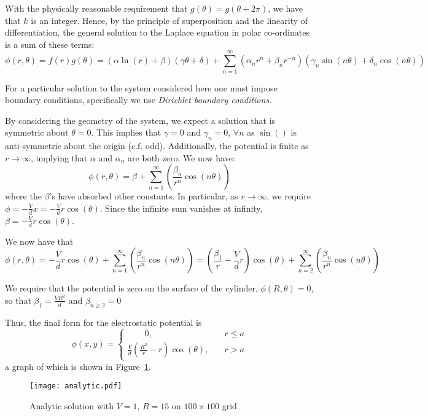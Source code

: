 \documentclass[12pt, a4paper]{article}
\newcommand{\be}{\begin{equation}}
\newcommand{\ee}{\end{equation}}
\begin{document}
With the physically reasonable requirement that $g(\theta)=g(\theta + 2\pi)$, we have
that $k$ is an integer. Hence, by the principle of superposition and the linearity of
differentiation, the general solution to the Laplace equation in polar co-ordinates is
a sum of these terms:
%
\be
\phi(r,\theta)
= f(r)g(\theta)
= (\alpha \ln(r) + \beta)(\gamma\theta + \delta) + \sum_{n=1}^{\infty}(\alpha_n r^n+\beta_n r^{-n})(\gamma_n \sin(n\theta) + \delta_n \cos(n\theta))
\ee

For a particular solution to the system considered here one must impose boundary
conditions, specifically we use \emph{Dirichlet boundary conditions}.

By considering the geometry of the system, we expect a solution that is symmetric
about $\theta=0$. This implies that $\gamma = 0$ and $\gamma_n=0$, $\forall n$ as
$\sin()$ is anti-symmetric about the origin (c.f. odd). Additionally, the potential
is finite as $r \rightarrow \infty$, implying that $\alpha$ and $\alpha_n$ are both
zero. We now have:
%
\be
\phi(r,\theta)=\beta + \sum_{n=1}^{\infty}(\frac{\beta_n}{r^n} \cos(n\theta))
\ee
%
where the $\beta$'s have absorbed other constants. In particular, as
$r \rightarrow \infty$, we require $\phi=-\frac{V}{d}x=-\frac{V}{d}r\cos(\theta)$.
Since the infinite sum vanishes at infinity, $\beta=-\frac{V}{d}r\cos(\theta)$.

We now have that
%
\be
\phi(r,\theta)=-\frac{V}{d}r\cos(\theta) + \sum_{n=1}^{\infty}(\frac{\beta_n}{r^n} \cos(n\theta))
              =(\frac{\beta_1}{r}-\frac{V}{d}r)\cos(\theta) + \sum_{n=2}^{\infty}(\frac{\beta_n}{r^n} \cos(n\theta))
\ee

We require that the potential is zero on the surface of the cylinder,
$\phi(R,\theta)=0$, so that $\beta_1=\frac{VR^2}{d}$ and $\beta_{n \geq 2}=0$

Thus, the final form for the electrostatic potential is
%
\be
\phi(x,y)=
\begin{cases} \qquad 0, & \quad r \leq a \\
\frac{V}{d}(\frac{R^2}{r}-r)\cos(\theta), & \quad r > a
\end{cases}
\ee
%
a graph of which is shown in Figure~\ref{fig:analytic}.

\begin{figure}
\begin{center}
\texttt{[image: analytic.pdf]}
\caption{Analytic solution with $V=1$, $R=15$ on $100\times100$ grid}
\label{fig:analytic}
\end{center}
\end{figure}
\end{document}
